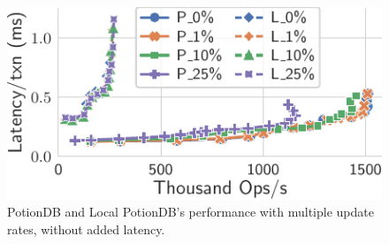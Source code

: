 \documentclass[sigplan,review,anonymous]{acmart}
\begin{document}
\begin{figure}
	\centering
	\includegraphics[width=0.62\linewidth]{singleQuery/upd_rate_noTC_global_vs_local}
	\vspace*{-0.65em}
	\caption{PotionDB and Local PotionDB's performance with multiple update rates, without added latency.}
	\label{fig:update_rates_global_vs_local_noTC}
	\vspace*{-1.3em}
\end{figure}
\end{document}
